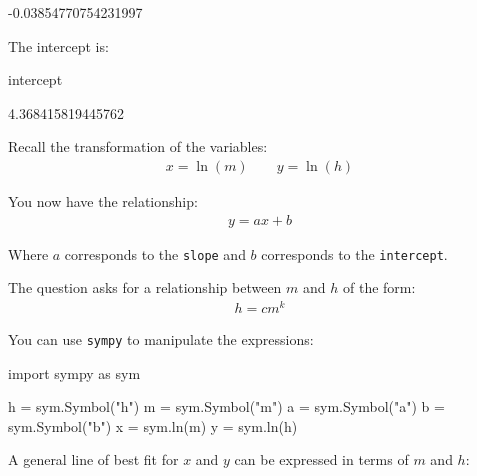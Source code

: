 \begin{raw}
-0.03854770754231997
\end{raw}





The intercept is:




\begin{pyin}
intercept
\end{pyin}





\begin{raw}
4.368415819445762
\end{raw}





Recall the transformation of the variables:
\begin{equation*}
\begin{split}x=\ln(m)\qquad y=\ln(h)\end{split}
\end{equation*}

You now have the relationship:
\begin{equation*}
\begin{split}y=ax + b\end{split}
\end{equation*}

Where \(a\) corresponds to the \texttt{slope} and \(b\) corresponds to the
\texttt{intercept}.


The question asks for a relationship between \(m\) and \(h\) of the form:
\begin{equation*}
\begin{split}h=cm^k\end{split}
\end{equation*}

You can use \texttt{sympy} to manipulate the expressions:




\begin{pyin}
import sympy as sym

h = sym.Symbol("h")
m = sym.Symbol("m")
a = sym.Symbol("a")
b = sym.Symbol("b")
x = sym.ln(m)
y = sym.ln(h)
\end{pyin}





A general line of best fit for \(x\) and \(y\) can be expressed in terms of \(m\) and
\(h\):




